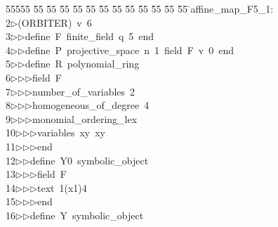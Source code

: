 %
%
\begin{tabbing}
55555 \= 55 \= 55 \= 55 \= 55 \= 55 \= 55 \= 55 \= 55 \= 55 \= 55 \= 55 \= 55 \= \>affine\_map\_F5\_1:\\[0pt]
2\>$\triangleright$\>(ORBITER)\ v\ 6\ \\[0pt]
3\>$\triangleright$\>$\triangleright$\>define\ F\ finite\_field\ q\ 5\ end\ \\[0pt]
4\>$\triangleright$\>$\triangleright$\>define\ P\ projective\_space\ n\ 1\ field\ F\ v\ 0\ end\ \\[0pt]
5\>$\triangleright$\>$\triangleright$\>define\ R\ polynomial\_ring\ \\[0pt]
6\>$\triangleright$\>$\triangleright$\>$\triangleright$\>field\ F\ \\[0pt]
7\>$\triangleright$\>$\triangleright$\>$\triangleright$\>number\_of\_variables\ 2\ \\[0pt]
8\>$\triangleright$\>$\triangleright$\>$\triangleright$\>homogeneous\_of\_degree\ 4\ \\[0pt]
9\>$\triangleright$\>$\triangleright$\>$\triangleright$\>monomial\_ordering\_lex\ \\[0pt]
10\>$\triangleright$\>$\triangleright$\>$\triangleright$\>variables\ xy\ xy\ \\[0pt]
11\>$\triangleright$\>$\triangleright$\>$\triangleright$\>end\ \\[0pt]
12\>$\triangleright$\>$\triangleright$\>define\ Y0\ symbolic\_object\ \\[0pt]
13\>$\triangleright$\>$\triangleright$\>$\triangleright$\>field\ F\ \\[0pt]
14\>$\triangleright$\>$\triangleright$\>$\triangleright$\>text\ 1(x1)4\ \\[0pt]
15\>$\triangleright$\>$\triangleright$\>$\triangleright$\>end\ \\[0pt]
16\>$\triangleright$\>$\triangleright$\>define\ Y\ symbolic\_object\ \\[0pt]

\end{tabbing}
